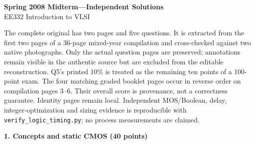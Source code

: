 \documentclass[10pt]{article}
\newcommand{\qheading}[1]{\par\medskip\textbf{#1}\par}
\begin{document}
\begin{center}{\Large\bfseries Spring 2008 Midterm---Independent Solutions}\\EE332 Introduction to VLSI\end{center}
The complete original has two pages and five questions. It is extracted from the first two pages of a 36-page mixed-year compilation and cross-checked against two native photographs. Only the actual question pages are preserved; annotations remain visible in the authentic source but are excluded from the editable reconstruction. Q5's printed 10\% is treated as the remaining ten points of a 100-point exam.
The four matching graded booklet pages occur in reverse order on compilation pages 3--6. Their overall score is provenance, not a correctness guarantee. Identity pages remain local. Independent MOS/Boolean, delay, integer-optimization and sizing evidence is reproducible with \texttt{verify\_logic\_timing.py}; no process measurements are claimed.
\qheading{1. Concepts and static CMOS (40 points)}
\end{document}
